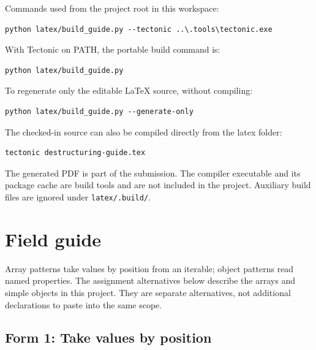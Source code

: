 \documentclass[10pt,a4paper]{article}
\begin{document}
Commands used from the project root in this workspace:

\begin{lstlisting}[language={}]
python latex/build_guide.py --tectonic ..\.tools\tectonic.exe
\end{lstlisting}


With Tectonic on PATH, the portable build command is:

\begin{lstlisting}[language={}]
python latex/build_guide.py
\end{lstlisting}


To regenerate only the editable LaTeX source, without compiling:

\begin{lstlisting}[language={}]
python latex/build_guide.py --generate-only
\end{lstlisting}


The checked-in source can also be compiled directly from the latex folder:

\begin{lstlisting}[language={}]
tectonic destructuring-guide.tex
\end{lstlisting}

The generated PDF is part of the submission. The compiler executable and its package cache are build tools and are not included in the project. Auxiliary build files are ignored under \texttt{latex/\allowbreak{}.\allowbreak{}build/\allowbreak{}}.

\section{Field guide}

Array patterns take values by position from an iterable; object patterns read named properties. The assignment alternatives below describe the arrays and simple objects in this project. They are separate alternatives, not additional declarations to paste into the same scope.

\subsection{Form 1: Take values by position}
\end{document}
